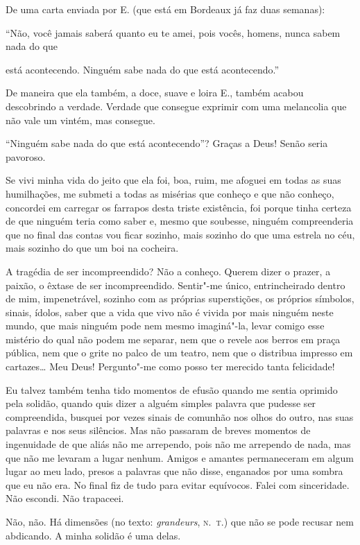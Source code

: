 De uma carta enviada por E. (que está em Bordeaux já faz duas semanas):

``Não, você jamais saberá quanto eu te amei, pois vocês, homens, nunca
sabem nada do que \linebreak

\noindent{}está acontecendo. Ninguém sabe nada do que está
acontecendo.''

De maneira que ela também, a doce, suave e loira E., também acabou
descobrindo a verdade. Verdade que consegue exprimir com uma
melancolia que não vale um vintém, mas consegue.

``Ninguém sabe nada do que está acontecendo''? Graças a Deus! Senão
seria pavoroso.

Se vivi minha vida do jeito que ela foi, boa, ruim, me
afoguei em todas as suas humilhações, me submeti a todas as
misérias que conheço e que não conheço, concordei em carregar os
farrapos desta triste existência, foi porque tinha certeza de que
ninguém teria como saber e, mesmo que soubesse, ninguém
compreenderia que no final das contas vou ficar sozinho, mais sozinho
do que uma estrela no céu, mais sozinho do que um boi na cocheira.

A tragédia de ser incompreendido? Não a conheço. Querem dizer o prazer,
a paixão, o êxtase de ser incompreendido. Sentir"-me único,
entrincheirado dentro de mim, impenetrável, sozinho com as próprias
superstições, os próprios símbolos, sinais, ídolos, saber que a vida
que vivo não é vivida por mais ninguém neste mundo, que mais ninguém
pode nem mesmo imaginá"-la, levar comigo esse mistério do qual não podem
me separar, nem que o revele aos berros em praça pública, nem que
o grite no palco de um teatro, nem que o distribua impresso em
cartazes\ldots{} Meu Deus! Pergunto"-me como posso ter merecido tanta
felicidade!

Eu talvez também tenha tido momentos de efusão quando me sentia
oprimido pela solidão, quando quis dizer a alguém simples palavra
que pudesse ser compreendida, busquei por vezes sinais de
comunhão nos olhos do outro, nas suas palavras e nos seus silêncios. Mas
não passaram de breves momentos de ingenuidade de que aliás não me
arrependo, pois não me arrependo de nada, mas que não me levaram a lugar
nenhum. Amigos e amantes permaneceram em algum lugar ao meu lado, presos
a palavras que não disse, enganados por uma sombra que eu não era. No
final fiz de tudo para evitar equívocos. Falei com sinceridade. Não
escondi. Não trapaceei.

Não, não. Há dimensões (no texto: \emph{grandeurs}, \textsc{n.~t.}) que não se
pode recusar nem abdicando. A minha solidão é uma delas.


